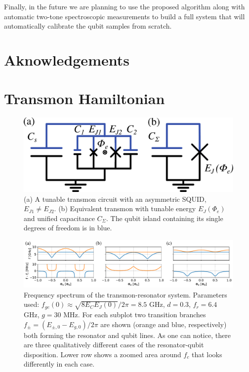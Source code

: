 \documentclass[%
 aip,
 draft,
 amsmath,amssymb,
 reprint,%
]{revtex4-1}
\begin{document}
Finally, in the future we are planning to use the proposed algorithm along with automatic two-tone spectroscopic measurements to build a full system that will automatically calibrate the qubit samples from scratch.


\section{Aknowledgements}


\appendix



\section{Transmon Hamiltonian}\label{sec:transmon}

\begin{figure}[b]
	\centering
	\includegraphics[width=\linewidth]{transmon}
	\caption{(a) A tunable transmon circuit with an asymmetric SQUID, $E_{J1} \neq E_{J2}$. (b) Equivalent transmon with tunable energy $E_{J}(\Phi_e)$ and unified capacitance $C_{\Sigma}$. The qubit island containing its single degrees of freedom is in blue.}
	\label{fig:trans}
\end{figure}

\begin{figure}
	\centering
	\includegraphics[width=\textwidth]{anti_theor}
	\caption{Frequency spectrum of the transmon-resonator system. Parameters used: $f_{ge}(0) \approx \sqrt{8E_C E_J(0)}/2\pi = 8.5$ GHz, $d=0.3$, $f_r=6.4$ GHz, $g = 30$ MHz. For each subplot two transition branches  $f_{\pm} = (E_{\pm,0} - E_{g,0})/2\pi$ are shown (orange and blue, respectively) both forming the resonator and qubit lines. As one can notice, there are three qualitatively different cases of the resonator-qubit disposition. Lower row shows a zoomed area around $f_c$ that looks differently in each case.}
	\label{fig:anti_theor}
\end{figure}
\end{document}
